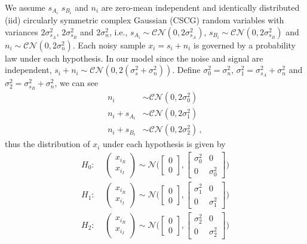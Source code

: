 We assume  $s_{A_i}$ $s_{B_i}$ and $n_i$ are zero-mean independent and identically distributed (iid) circularly symmetric complex Gaussian (CSCG) random variables with variances $2\sigma_{s_A}^2$, $2\sigma_{s_B}^2$ and $2\sigma_{n}^2$, i.e., $s_{A_i} \sim \mathcal{CN}(0, 2\sigma_{s_A}^2)$, $s_{B_i} \sim \mathcal{CN}(0, 2\sigma_{s_B}^2)$ and $n_i \sim \mathcal{CN}(0, 2\sigma_{n}^2)$.
Each noisy sample $x_i = s_i + n_i$ is governed by a probability law under each hypothesis. In our model
since the noise and signal are independent, $s_i+ n_i \sim \mathcal{CN}(0, 2(\sigma_{s}^2 + \sigma_n^2))$.  Define $\sigma_0^2 = \sigma_n^2$, $\sigma_1^2 = \sigma_{s_A}^2 + \sigma_n^2$ and $\sigma_2^2 = \sigma_{s_B}^2 + \sigma_n^2$, we can see
\begin{equation}
  \label{1129a1}
  \begin{split}
  n_i &\sim \mathcal{CN}(0, 2\sigma_0^2)\\
  n_i + s_{A_i} &\sim \mathcal{CN}(0, 2\sigma_1^2)\\
   n_i + s_{B_i}&\sim \mathcal{CN}(0, 2\sigma_2^2) \,,
  \end{split}
\end{equation}
thus the distribution of $x_i$ under each hypothesis is given by
\begin{equation}
   \begin{split}
  H_0:\;\;\;\;\begin{pmatrix} x_{i_R} \\ x_{i_I} \end{pmatrix} \sim \mathcal{N}\Big( \begin{bmatrix} 0 \\ 0 \end{bmatrix}, \begin{bmatrix} \sigma_0^2 & 0\\ 0 & \sigma_0^2 \end{bmatrix} \Big)\\
  H_1:\;\;\;\;\begin{pmatrix} x_{i_R} \\ x_{i_I} \end{pmatrix} \sim \mathcal{N}\Big( \begin{bmatrix} 0 \\ 0 \end{bmatrix}, \begin{bmatrix} \sigma_1^2 & 0\\ 0 & \sigma_1^2 \end{bmatrix} \Big)\\
  H_2:\;\;\;\;\begin{pmatrix} x_{i_R} \\ x_{i_I} \end{pmatrix} \sim \mathcal{N}\Big( \begin{bmatrix} 0 \\ 0 \end{bmatrix}, \begin{bmatrix} \sigma_2^2 & 0\\ 0 & \sigma_2^2 \end{bmatrix} \Big)
\end{split}
  \label{equ:xdistribution}
\end{equation}

